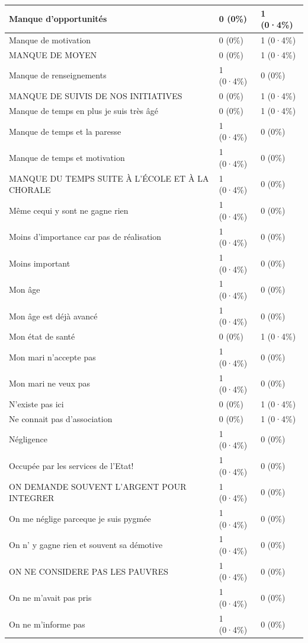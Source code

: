 \documentclass[
]{book}
\begin{document}
\begin{tabular}{l|l|l}
\hline
Manque d'opportunités & 0 (0\%) & 1 (0·4\%)\\
\hline
Manque de motivation & 0 (0\%) & 1 (0·4\%)\\
\hline
MANQUE DE MOYEN & 0 (0\%) & 1 (0·4\%)\\
\hline
Manque de renseignements & 1 (0·4\%) & 0 (0\%)\\
\hline
MANQUE DE SUIVIS DE NOS INITIATIVES & 0 (0\%) & 1 (0·4\%)\\
\hline
Manque de temps en plus je suis très âgé & 0 (0\%) & 1 (0·4\%)\\
\hline
Manque de temps et la paresse & 1 (0·4\%) & 0 (0\%)\\
\hline
Manque de temps et motivation & 1 (0·4\%) & 0 (0\%)\\
\hline
MANQUE DU TEMPS SUITE À L'ÉCOLE ET À LA CHORALE & 1 (0·4\%) & 0 (0\%)\\
\hline
Même cequi y sont ne gagne rien & 1 (0·4\%) & 0 (0\%)\\
\hline
Moins d'importance car pas de réalisation & 1 (0·4\%) & 0 (0\%)\\
\hline
Moins important & 1 (0·4\%) & 0 (0\%)\\
\hline
Mon âge & 1 (0·4\%) & 0 (0\%)\\
\hline
Mon âge est déjà avancé & 1 (0·4\%) & 0 (0\%)\\
\hline
Mon état de santé & 0 (0\%) & 1 (0·4\%)\\
\hline
Mon mari n'accepte pas & 1 (0·4\%) & 0 (0\%)\\
\hline
Mon mari ne veux pas & 1 (0·4\%) & 0 (0\%)\\
\hline
N'existe pas ici & 0 (0\%) & 1 (0·4\%)\\
\hline
Ne connait pas d'association & 0 (0\%) & 1 (0·4\%)\\
\hline
Négligence & 1 (0·4\%) & 0 (0\%)\\
\hline
Occupée par les services de l'Etat! & 1 (0·4\%) & 0 (0\%)\\
\hline
ON DEMANDE SOUVENT L'ARGENT POUR INTEGRER & 1 (0·4\%) & 0 (0\%)\\
\hline
On me néglige parceque je suis pygmée & 1 (0·4\%) & 0 (0\%)\\
\hline
On n' y gagne rien et souvent sa démotive & 1 (0·4\%) & 0 (0\%)\\
\hline
ON NE CONSIDERE PAS LES PAUVRES & 1 (0·4\%) & 0 (0\%)\\
\hline
On ne m'avait pas pris & 1 (0·4\%) & 0 (0\%)\\
\hline
On ne m'informe pas & 1 (0·4\%) & 0 (0\%)\\

\end{tabular}
\end{document}
